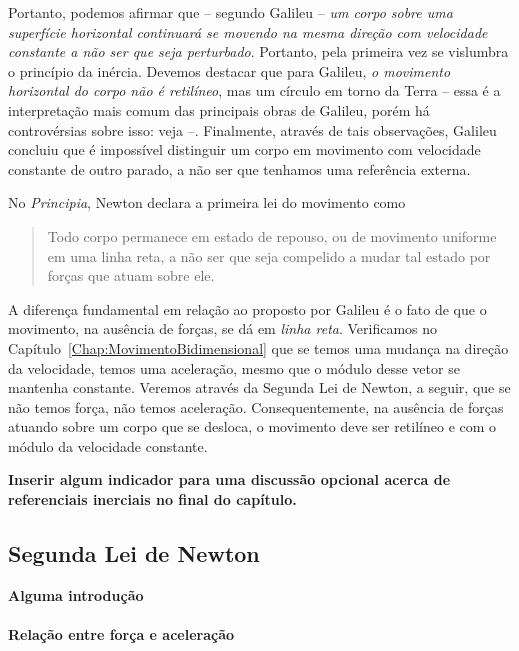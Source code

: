 %
Portanto, podemos afirmar que -- segundo Galileu -- \emph{um corpo sobre uma superfície horizontal continuará se movendo na mesma direção com velocidade constante a não ser que seja perturbado}. Portanto, pela primeira vez se vislumbra o princípio da inércia. Devemos destacar que para Galileu, \emph{o movimento horizontal do corpo não é retilíneo}, mas um círculo em torno da Terra -- essa é a interpretação mais comum das principais obras de Galileu, porém há controvérsias sobre isso: veja \cite{VASCONCELOS2005} --. Finalmente, através de tais observações, Galileu concluiu que é impossível distinguir um corpo em movimento com velocidade constante de outro parado, a não ser que tenhamos uma referência externa.

No \emph{Principia}, Newton declara a primeira lei do movimento como
\begin{quote}
  Todo corpo permanece em estado de repouso, ou de movimento uniforme em uma linha reta, a não ser que seja compelido a mudar tal estado por forças que atuam sobre ele.
\end{quote}
%
A diferença fundamental em relação ao proposto por Galileu é o fato de que o movimento, na ausência de forças, se dá em \emph{linha reta}. Verificamos no Capítulo~\ref{Chap:MovimentoBidimensional} que se temos uma mudança na direção da velocidade, temos uma aceleração, mesmo que o módulo desse vetor se mantenha constante. Veremos através da Segunda Lei de Newton, a seguir, que se não temos força, não temos aceleração. Consequentemente, na ausência de forças atuando sobre um corpo que se desloca, o movimento deve ser retilíneo e com o módulo da velocidade constante.

\textbf{Inserir algum indicador para uma discussão opcional acerca de referenciais inerciais no final do capítulo.}

\subsection{Segunda Lei de Newton}

\textbf{Alguma introdução}

\paragraph{Relação entre força e aceleração}

